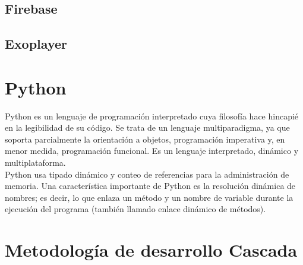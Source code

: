 \subsection{Firebase}

\subsection{Exoplayer}

\section{Python}
Python es un lenguaje de programación interpretado cuya filosofía hace hincapié en la legibilidad de su código. Se trata de un lenguaje multiparadigma, ya que soporta parcialmente la orientación a objetos, programación imperativa y, en menor medida, programación funcional. Es un lenguaje interpretado, dinámico y multiplataforma.\\

Python usa tipado dinámico y conteo de referencias para la administración de memoria. Una característica importante de Python es la resolución dinámica de nombres; es decir, lo que enlaza un método y un nombre de variable durante la ejecución del programa (también llamado enlace dinámico de métodos).\\

\section{Metodología de desarrollo Cascada}